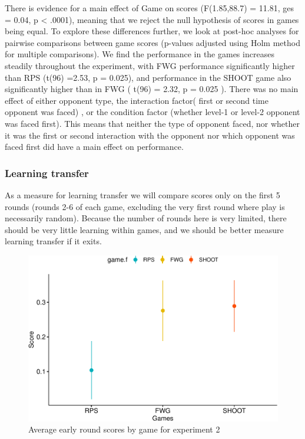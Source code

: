 \documentclass[man,floatsintext]{apa6}
\begin{document}
There is evidence for a main effect of Game on scores (F(1.85,88.7) = 11.81, ges = 0.04, p \textless{} .0001), meaning that we reject the null hypothesis of scores in games being equal. To explore these differences further, we look at post-hoc analyses for pairwise comparisons between game scores (p-values adjusted using Holm method for multiple comparisons). We find the performance in the games increases steadily throughout the experiment, with FWG performance significantly higher than RPS (t(96) =2.53, p = 0.025), and performance in the SHOOT game also significantly higher than in FWG ( t(96) = 2.32, p = 0.025 ). There was no main effect of either opponent type, the interaction factor( first or second time opponent was faced) , or the condition factor (whether level-1 or level-2 opponent was faced first). This means that neither the type of opponent faced, nor whether it was the first or second interaction with the opponent nor which opponent was faced first did have a main effect on performance.

\hypertarget{learning-transfer-1}{%
\subsubsection{Learning transfer}\label{learning-transfer-1}}

As a measure for learning transfer we will compare scores only on the first 5 rounds (rounds 2-6 of each game, excluding the very first round where play is necessarily random). Because the number of rounds here is very limited, there should be very little learning within games, and we should be better measure learning transfer if it exits.

\begin{figure}

{\centering \includegraphics{draft_report_v1_files/figure-latex/exp2-early-scores-1} 

}

\caption{Average early round scores by game for experiment 2}\label{fig:exp2-early-scores}
\end{figure}
\end{document}
